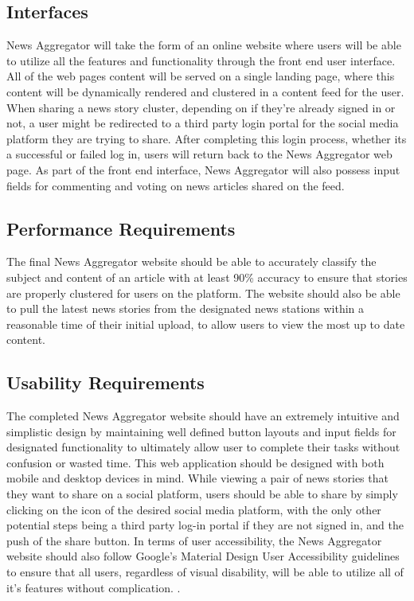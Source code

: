 \documentclass[onecolumn, draftclsnofoot,10pt, compsoc]{IEEEtran}
\begin{document}
\subsection{Interfaces}
News Aggregator will take the form of an online website where users will be able to utilize all the features and functionality through the front end user interface. All of the web pages content will be served on a single landing page, where this content will be dynamically rendered and clustered in a content feed for the user. When sharing a news story cluster, depending on if they’re already signed in or not, a user might be redirected to a third party login portal for the social media platform they are trying to share. After completing this login process, whether its a successful or failed log in, users will return back to the News Aggregator web page. As part of the front end interface, News Aggregator will also possess input fields for commenting and voting on news articles shared on the feed.
\subsection{Performance Requirements}
The final News Aggregator website should be able to accurately classify the subject and content of an article with at least 90\% accuracy to ensure that stories are properly clustered for users on the platform. The website should also be able to pull the latest news stories from the designated news stations within a reasonable time of their initial upload, to allow users to view the most up to date content.
\subsection{Usability Requirements}
The completed News Aggregator website should have an extremely intuitive and simplistic design by maintaining well defined button layouts and input fields for designated functionality to ultimately allow user to complete their tasks without confusion or wasted time. This web application should be designed with both mobile and desktop devices in mind. While viewing a pair of news stories that they want to share on a social platform, users should be able to share by simply clicking on the icon of the desired social media platform, with the only other potential steps being a third party log-in portal if they are not signed in, and the push of the share button. In terms of user accessibility, the News Aggregator website should also follow Google’s Material Design User Accessibility guidelines to ensure that all users, regardless of visual disability, will be able to utilize all of it's features without complication. \cite{accessibility_guidelines}.
\end{document}
